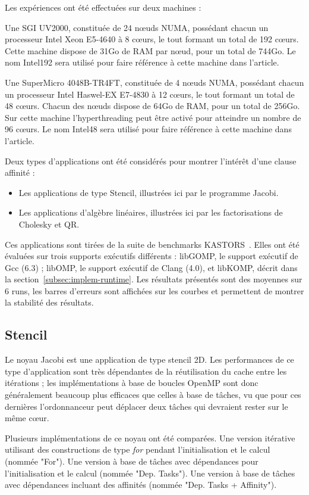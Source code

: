 \documentclass[parallelisme]{compas2017}
\begin{document}
Les expériences ont été effectuées sur deux machines :

Une SGI UV2000, constituée de
24 nœuds NUMA, possédant chacun un processeur Intel Xeon E5-4640 à 8 cœurs,
le tout formant un total de 192 cœurs. Cette machine dispose de 31Go de RAM
par nœud, pour un total de 744Go. Le nom Intel192 sera utilisé pour faire
référence à cette machine dans l'article.

Une SuperMicro 4048B-TR4FT, constituée de 4 nœuds NUMA, possédant chacun un
processeur Intel Haswel-EX E7-4830 à 12 cœurs, le tout formant un total de 48 cœurs.
Chacun des nœuds dispose de 64Go de RAM, pour un total de 256Go.
Sur cette machine l'hyperthreading peut être activé pour atteindre un nombre de 96 cœurs.
Le nom Intel48 sera utilisé pour faire référence à cette machine dans l'article.

Deux types d'applications ont été considérés pour montrer l'intérêt d'une clause affinité :
\begin{itemize}
    \item Les applications de type Stencil, illustrées ici par le programme Jacobi.
    \item Les applications d'algèbre linéaires, illustrées ici par les factorisations de Cholesky et QR.
\end{itemize}


Ces applications sont tirées de la suite de benchmarks KASTORS~\cite{virouleau:hal-01081974}.  
Elles ont été évaluées sur trois supports exécutifs différents : libGOMP, le support
exécutif de Gcc (6.3) ; libOMP, le support exécutif de Clang (4.0), et libKOMP, décrit
dans la section~\ref{subsec:implem-runtime}.
Les résultats présentés sont des moyennes sur 6 runs, les barres d'erreurs sont
affichées sur les courbes et permettent de montrer la stabilité des résultats.

\subsection{Stencil}

Le noyau Jacobi est une application de type stencil 2D.
Les performances de ce type d'application sont très dépendantes de la réutilisation
du cache entre les itérations ; les implémentations à base de boucles OpenMP sont
donc généralement beaucoup plus efficaces que celles à base de tâches, vu que
pour ces dernières l'ordonnanceur peut déplacer deux tâches qui devraient rester
sur le même cœur.

Plusieurs implémentations de ce noyau ont été comparées. Une version itérative
utilisant des constructions de type \textit{for} pendant l'initialisation et le
calcul (nommée "For"). Une version à base de tâches avec dépendances pour l'initialisation
et le calcul (nommée "Dep. Tasks"). Une version à base de tâches avec dépendances
incluant des affinités (nommée "Dep. Tasks + Affinity").
\end{document}
